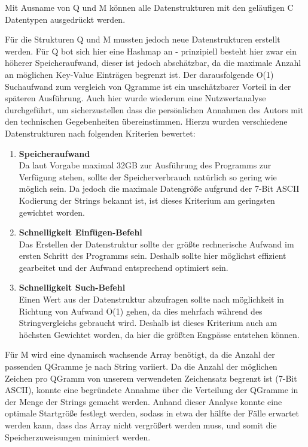 Mit Ausname von Q und M können alle Datenstrukturen mit den geläufigen C
Datentypen ausgedrückt werden.

Für die Strukturen Q und M mussten jedoch neue Datenstrukturen
erstellt werden. Für Q bot sich hier eine Hashmap an - prinzipiell besteht
hier zwar ein höherer Speicheraufwand, dieser ist jedoch abschätzbar, da die
maximale Anzahl an möglichen Key-Value Einträgen begrenzt ist. Der darausfolgende
O(1) Suchaufwand zum vergleich von Qgramme ist ein unschätzbarer Vorteil in der
späteren Ausführung. Auch hier wurde wiederum eine Nutzwertanalyse durchgeführt,
um sicherzustellen dass die persönlichen Annahmen des Autors mit den technischen
Gegebenheiten übereinstimmen.
Hierzu wurden verschiedene Datenstrukturen nach folgenden Kriterien bewertet:
\begin{enumerate}
    \item \textbf{Speicheraufwand} \\
    Da laut Vorgabe maximal 32GB zur Ausführung des Programms zur Verfügung stehen,
    sollte der Speicherverbrauch natürlich so gering wie möglich sein. Da jedoch
    die maximale Datengröße aufgrund der 7-Bit ASCII Kodierung der Strings
    bekannt ist, ist dieses Kriterium am geringsten gewichtet worden.\par
    \item \textbf{Schnelligkeit Einfügen-Befehl} \\
    Das Erstellen der Datenstruktur sollte der größte rechnerische Aufwand im
    ersten Schritt des Programms sein. Deshalb sollte hier möglichst effizient gearbeitet und
    der Aufwand entsprechend optimiert sein.\par
    \item \textbf{Schnelligkeit Such-Befehl} \\
    Einen Wert aus der Datenstruktur abzufragen sollte nach möglichkeit in
    Richtung von Aufwand O(1) gehen, da dies mehrfach während des Stringvergleichs
    gebraucht wird. Deshalb ist dieses Kriterium auch am höchsten Gewichtet worden,
    da hier die größten Engpässe entstehen können.\par

\end{enumerate}

Für M wird eine dynamisch wachsende Array benötigt, da die Anzahl der passenden
QGramme je nach String variiert. Da die Anzahl der möglichen Zeichen pro QGramm von unserem
verwendeten Zeichensatz begrenzt ist (7-Bit ASCII), konnte eine begründete Annahme
über die Verteilung der QGramme in der Menge der Strings gemacht werden.
Anhand dieser Analyse konnte eine optimale Startgröße festlegt werden, sodass in etwa der hälfte der Fälle
erwartet werden kann, dass das Array nicht vergrößert werden muss, und somit die
Speicherzuweisungen minimiert werden.

